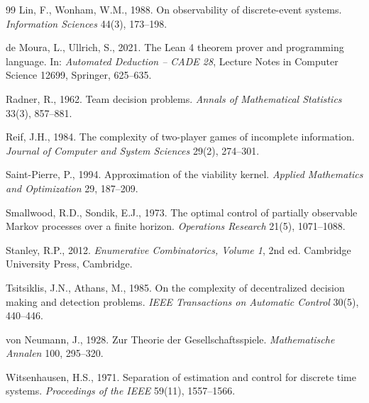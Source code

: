 \documentclass[11pt,a4paper]{article}
\theoremstyle{plain}
\theoremstyle{definition}
\theoremstyle{remark}
\begin{document}
\begin{thebibliography}{99}
 Lin, F., Wonham, W.M., 1988. On observability of discrete-event systems. \emph{Information Sciences} 44(3), 173--198.

 de Moura, L., Ullrich, S., 2021. The Lean 4 theorem prover and programming language. In: \emph{Automated Deduction -- CADE 28}, Lecture Notes in Computer Science 12699, Springer, 625--635.

 Radner, R., 1962. Team decision problems. \emph{Annals of Mathematical Statistics} 33(3), 857--881.

 Reif, J.H., 1984. The complexity of two-player games of incomplete information. \emph{Journal of Computer and System Sciences} 29(2), 274--301.

 Saint-Pierre, P., 1994. Approximation of the viability kernel. \emph{Applied Mathematics and Optimization} 29, 187--209.

 Smallwood, R.D., Sondik, E.J., 1973. The optimal control of partially observable Markov processes over a finite horizon. \emph{Operations Research} 21(5), 1071--1088.

 Stanley, R.P., 2012. \emph{Enumerative Combinatorics, Volume 1}, 2nd ed. Cambridge University Press, Cambridge.

 Tsitsiklis, J.N., Athans, M., 1985. On the complexity of decentralized decision making and detection problems. \emph{IEEE Transactions on Automatic Control} 30(5), 440--446.

 von Neumann, J., 1928. Zur Theorie der Gesellschaftsspiele. \emph{Mathematische Annalen} 100, 295--320.

 Witsenhausen, H.S., 1971. Separation of estimation and control for discrete time systems. \emph{Proceedings of the IEEE} 59(11), 1557--1566.
\end{thebibliography}
\end{document}

